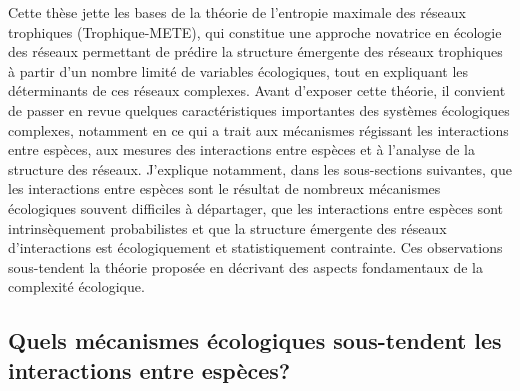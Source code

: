 Cette thèse jette les bases de la théorie de l'entropie maximale des réseaux
trophiques (Trophique-METE), qui constitue une approche novatrice en écologie
des réseaux permettant de prédire la structure émergente des réseaux trophiques
à partir d'un nombre limité de variables écologiques, tout en expliquant les
déterminants de ces réseaux complexes. Avant d'exposer cette théorie, il
convient de passer en revue quelques caractéristiques importantes des systèmes
écologiques complexes, notamment en ce qui a trait aux mécanismes régissant les
interactions entre espèces, aux mesures des interactions entre espèces et à
l'analyse de la structure des réseaux. J'explique notamment, dans les
sous-sections suivantes, que les interactions entre espèces sont le résultat de
nombreux mécanismes écologiques souvent difficiles à départager, que les
interactions entre espèces sont intrinsèquement probabilistes et que la
structure émergente des réseaux d'interactions est écologiquement et
statistiquement contrainte. Ces observations sous-tendent la théorie proposée en
décrivant des aspects fondamentaux de la complexité écologique.

\subsection{Quels mécanismes écologiques sous-tendent les interactions entre espèces?} 

